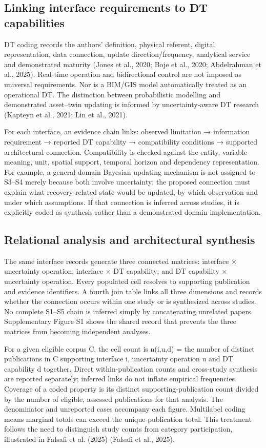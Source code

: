 \subsection{Linking interface requirements to DT capabilities}
DT coding records the authors' definition, physical referent, digital representation, data connection, update direction/frequency, analytical service and demonstrated maturity (Jones et al., 2020; Boje et al., 2020; Abdelrahman et al., 2025). Real-time operation and bidirectional control are not imposed as universal requirements. Nor is a BIM/GIS model automatically treated as an operational DT. The distinction between probabilistic modelling and demonstrated asset–twin updating is informed by uncertainty-aware DT research (Kapteyn et al., 2021; Lin et al., 2021).

For each interface, an evidence chain links: observed limitation → information requirement → reported DT capability → compatibility conditions → supported architectural connection. Compatibility is checked against the entity, variable meaning, unit, spatial support, temporal horizon and dependency representation. For example, a general-domain Bayesian updating mechanism is not assigned to S3–S4 merely because both involve uncertainty; the proposed connection must explain what recovery-related state would be updated, by which observation and under which assumptions. If that connection is inferred across studies, it is explicitly coded as synthesis rather than a demonstrated domain implementation.


\subsection{Relational analysis and architectural synthesis}
The same interface records generate three connected matrices: interface × uncertainty operation; interface × DT capability; and DT capability × uncertainty operation. Every populated cell resolves to supporting publication and evidence identifiers. A fourth join table links all three dimensions and records whether the connection occurs within one study or is synthesized across studies. No complete S1–S5 chain is inferred simply by concatenating unrelated papers. Supplementary Figure S1 shows the shared record that prevents the three matrices from becoming independent analyses.

For a given eligible corpus C, the cell count is n(i,u,d) = the number of distinct publications in C supporting interface i, uncertainty operation u and DT capability d together. Direct within-publication counts and cross-study synthesis are reported separately; inferred links do not inflate empirical frequencies. Coverage of a coded property is its distinct supporting-publication count divided by the number of eligible, assessed publications for that analysis. The denominator and unreported cases accompany each figure. Multilabel coding means marginal totals can exceed the unique-publication total. This treatment follows the need to distinguish study counts from category participation, illustrated in Falsafi et al. (2025) (Falsafi et al., 2025).

